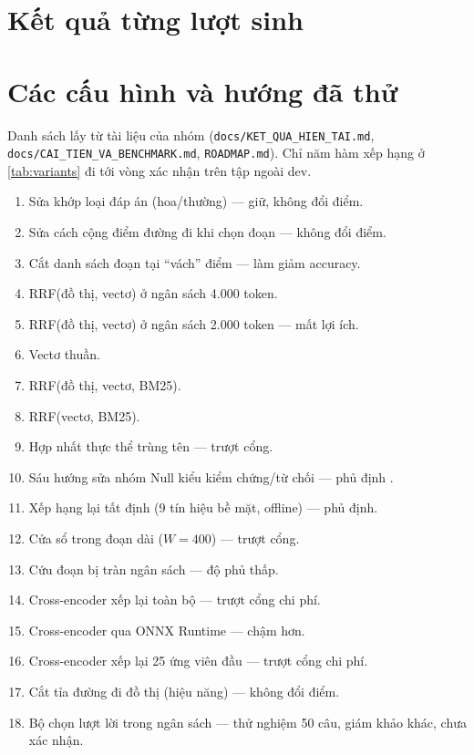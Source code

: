 \section{Kết quả từng lượt sinh}\label{app:runs}
\begin{table}[h]\centering
\caption{Accuracy từng lượt sinh trên \nHeld{} câu ngoài dev (lượt chấm 1).}
\label{tab:runs}
\small

\end{table}

\section{Các cấu hình và hướng đã thử}\label{app:tried}
Danh sách lấy từ tài liệu của nhóm (\texttt{docs/KET\_QUA\_HIEN\_TAI.md}, \texttt{docs/CAI\_TIEN\_VA\_BENCHMARK.md}, \texttt{ROADMAP.md}).
Chỉ năm hàm xếp hạng ở \cref{tab:variants} đi tới vòng xác nhận trên tập ngoài dev.
\begin{enumerate}\small
  \item Sửa khớp loại đáp án (hoa/thường) --- giữ, không đổi điểm.
  \item Sửa cách cộng điểm đường đi khi chọn đoạn --- không đổi điểm.
  \item Cắt danh sách đoạn tại ``vách'' điểm --- làm giảm accuracy.
  \item RRF(đồ thị, vectơ) ở ngân sách 4.000 token.
  \item RRF(đồ thị, vectơ) ở ngân sách 2.000 token --- mất lợi ích.
  \item Vectơ thuần.
  \item RRF(đồ thị, vectơ, BM25).
  \item RRF(vectơ, BM25).
  \item Hợp nhất thực thể trùng tên --- trượt cổng.
  \item[10--15.] Sáu hướng sửa nhóm Null kiểu kiểm chứng/từ chối --- phủ định .
  \setcounter{enumi}{15}
  \item Xếp hạng lại tất định (9 tín hiệu bề mặt, offline) --- phủ định.
  \item Cửa sổ trong đoạn dài ($W=400$) --- trượt cổng.
  \item Cứu đoạn bị tràn ngân sách --- độ phủ thấp.
  \item Cross-encoder xếp lại toàn bộ --- trượt cổng chi phí.
  \item Cross-encoder qua ONNX Runtime --- chậm hơn.
  \item Cross-encoder xếp lại 25 ứng viên đầu --- trượt cổng chi phí.
  \item Cắt tỉa đường đi đồ thị (hiệu năng) --- không đổi điểm.
  \item Bộ chọn lượt lời trong ngân sách --- thử nghiệm 50 câu, giám khảo khác, chưa xác nhận.
\end{enumerate}

